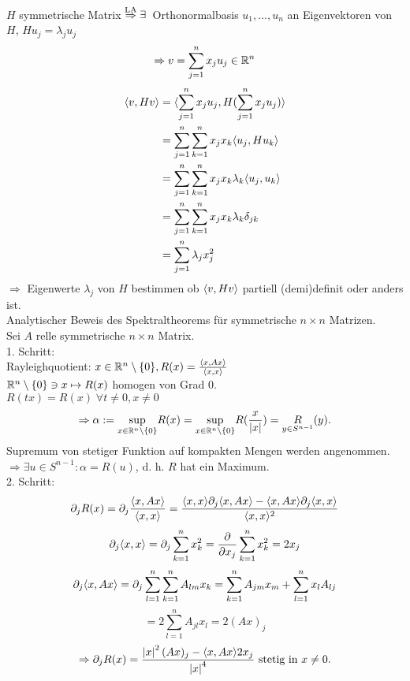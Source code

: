\documentclass[../ana2.tex]{subfiles}
\begin{document}
\(H\) symmetrische Matrix \( \oversett{LA}{\Rightarrow} \exists \)
Orthonormalbasis \( u_1,\ldots,u_n \) an 
Eigenvektoren von \(H\), \( H u_j = \lambda_j u_j \)
\[ \Rightarrow v = \sum_{j=1}^n x_j u_j \in \mathbb{R}^n \]
\begin{align*}
    \langle v, Hv \rangle &= 
    \langle \sum_{j=1}^n x_j u_j, H(\sum_{j=1}^n x_j u_j) \rangle\\
    &= \sum_{j=1}^n \sum_{k=1}^n x_j x_k \langle u_j, Hu_k \rangle\\
    &= \sum_{j=1}^n \sum_{k=1}^n x_j x_k \lambda_k \langle u_j, u_k \rangle\\
    &= \sum_{j=1}^n \sum_{k=1}^n x_j x_k \lambda_k \delta_{jk} \\
    &= \sum_{j=1}^n \lambda_j x_j^2
\end{align*}
\(\Rightarrow\) Eigenwerte \(\lambda_j\) von \(H\) bestimmen ob
\( \langle v, Hv \rangle \) partiell (demi)definit oder anders ist.\\
Analytischer Beweis des Spektraltheorems für symmetrische \(n \times n\)
Matrizen.\\
Sei \(A\) relle symmetrische \(n \times n\) Matrix.\\
1. Schritt:\\ 
Rayleighquotient: \(x \in \mathbb{R}^n \setminus \{0\}, R(x) 
= \frac{\langle x, Ax \rangle}{\langle x, x \rangle}\) \\
\( \mathbb{R}^n \setminus \{0\} \ni x \mapsto R(x) \) homogen von Grad \(0\).\\
\( R(tx) = R(x) \; \forall t \neq 0, x \neq 0 \)
\[ \Rightarrow \alpha := 
\underset{x \in \mathbb{R}^n\setminus \{0\}}{\sup}
R(x) = \underset{x\in\mathbb{R}^n \setminus \{0\}}{\sup} 
R(\frac{x}{\left|x\right|}) 
= \underset{y\in S^{n-1}}R(y). \]
Supremum von stetiger Funktion auf kompakten Mengen werden 
angenommen.
\( \Rightarrow \exists u \in S^{n-1}: \alpha = R(u) \), 
d. h. \(R\) hat ein Maximum.\\
2. Schritt:
\[ \partial_j R(x) = \partial_j 
\frac{\langle x, Ax \rangle}{\langle x, x \rangle} 
= \frac{ \langle x, x \rangle \partial_j \langle x, Ax \rangle 
- \langle x, Ax \rangle \partial_j 
\langle x, x \rangle }{\langle x, x \rangle^2} \]
\[ \partial_j \langle x, x \rangle  = \partial_j \sum_{k = 1}^n x_k^2
= \frac{\partial}{\partial x_j} \sum_{k=1}^n x_k^2 = 2x_j \]
\[ \partial_j \langle x, Ax \rangle 
= \partial_j \sum_{l=1}^n \sum_{k=1}^n A_{lm}x_k 
= \sum_{k=1}^n A_{jm} x_m + \sum_{l=1}^n x_lA_{lj} \]
\[ = 2\sum_{l=1}^n A_{jl} x_l 
= 2(Ax)_j \]
\[ \Rightarrow \partial_j R(x) 
= \frac{\left|x\right|^2 (Ax)_j - \langle x, Ax \rangle2x_j}{\left|x\right|^4} 
\text{ stetig in } x\neq 0. \]
\end{document}
